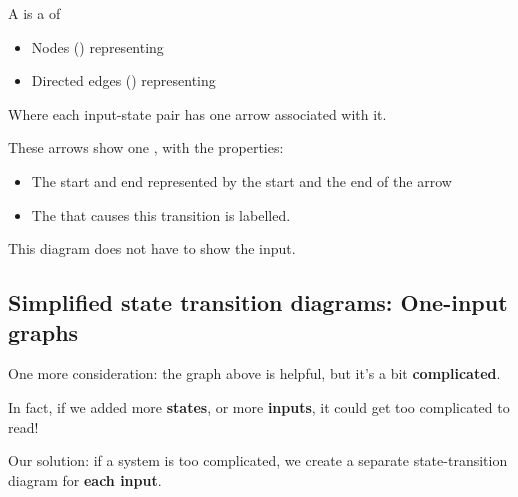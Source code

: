         \begin{definition}
            A  is a  of 
            
            \begin{itemize}
                \item Nodes () representing 
                \item Directed edges () representing 
            \end{itemize}
            
            Where each input-state pair has one arrow associated with it.
            
            These arrows show one , with the properties:
            
            \begin{itemize}
                \item The start and end  represented by the start and the end of the arrow
                \item The  that causes this transition is labelled.
            \end{itemize}
            
            This diagram does not have to show the input.
        \end{definition}
        

    \subsection{Simplified state transition diagrams: One-input graphs}
        
        One more consideration: the graph above is helpful, but it's a bit \textbf{complicated}. 
        
        In fact, if we added more \textbf{states}, or more \textbf{inputs}, it could get too complicated to read!
        
        Our solution: if a system is too complicated, we create a separate state-transition diagram for \textbf{each input}.
        
